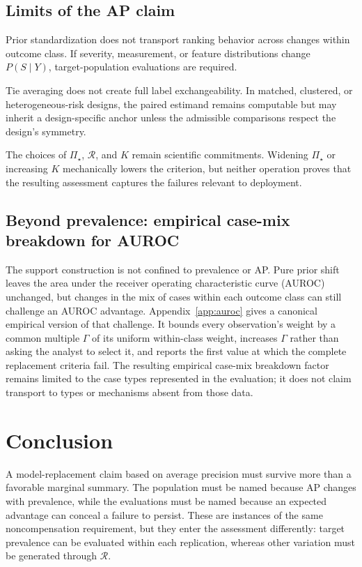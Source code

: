 \documentclass[11pt]{article}
\newcommand{\Regime}{\mathcal{R}}
\newcommand{\PSet}{\Pi_\star}
\theoremstyle{remark}
\begin{document}
\subsection{Limits of the AP claim}

Prior standardization does not transport ranking behavior across changes within outcome class. If severity, measurement, or feature distributions change $P(S\mid Y)$, target-population evaluations are required.

Tie averaging does not create full label exchangeability. In matched, clustered, or heterogeneous-risk designs, the paired estimand remains computable but may inherit a design-specific anchor unless the admissible comparisons respect the design's symmetry.

The choices of $\PSet$, $\Regime$, and $K$ remain scientific commitments. Widening $\PSet$ or increasing $K$ mechanically lowers the criterion, but neither operation proves that the resulting assessment captures the failures relevant to deployment.

\subsection{Beyond prevalence: empirical case-mix breakdown for AUROC}
\label{sec:auroc-outlook}

The support construction is not confined to prevalence or AP. Pure prior shift leaves the area under the receiver operating characteristic curve (AUROC) unchanged, but changes in the mix of cases within each outcome class can still challenge an AUROC advantage. Appendix~\ref{app:auroc} gives a canonical empirical version of that challenge. It bounds every observation's weight by a common multiple $\Gamma$ of its uniform within-class weight, increases $\Gamma$ rather than asking the analyst to select it, and reports the first value at which the complete replacement criteria fail. The resulting empirical case-mix breakdown factor remains limited to the case types represented in the evaluation; it does not claim transport to types or mechanisms absent from those data.

\section{Conclusion}

A model-replacement claim based on average precision must survive more than a favorable marginal summary. The population must be named because AP changes with prevalence, while the evaluations must be named because an expected advantage can conceal a failure to persist. These are instances of the same noncompensation requirement, but they enter the assessment differently: target prevalence can be evaluated within each replication, whereas other variation must be generated through $\Regime$.
\end{document}
